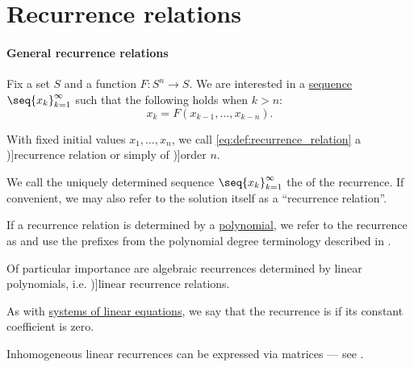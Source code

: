 \section{Recurrence relations}\label{sec:recurrence_relations}

\paragraph{General recurrence relations}

\begin{definition}\label{def:recurrence_relation}\mimprovised
  Fix a set \( S \) and a function \( F: S^n \to S \). We are interested in a \hyperref[def:sequence]{sequence} \( \seq{ x_k }_{k=1}^\infty \) such that the following holds when \( k > n \):
  \begin{equation}\label{eq:def:recurrence_relation}
    x_k = F(x_{k-1}, \ldots, x_{k-n}).
  \end{equation}

  With fixed initial values \( x_1, \ldots, x_n \), we call \eqref{eq:def:recurrence_relation} a \term[en=recurrence relation (\cite[def. 2.4.4]{Rosen2019DiscreteMathematics})]{recurrence relation} or simply  of \term[en=order (of linear recurring sequence) (\cite[395]{LidlNiederreiter1997FiniteFields})]{order} \( n \).

  \begin{thmenum}
     We call the uniquely determined sequence \( \seq{ x_k }_{k=1}^\infty \) the  of the recurrence. If convenient, we may also refer to the solution itself as a \enquote{recurrence relation}.

     If a recurrence relation is determined by a \hyperref[def:polynomial_algebra/polynomial]{polynomial}, we refer to the recurrence as  and use the prefixes from the polynomial degree terminology described in .

     Of particular importance are algebraic recurrences determined by linear polynomials, i.e. \term[en=linear recurring sequence (\cite[395]{LidlNiederreiter1997FiniteFields})]{linear recurrence relations}.

    As with \hyperref[rem:system_of_equations]{systems of linear equations}, we say that the recurrence is  if its constant coefficient is zero.

    Inhomogeneous linear recurrences can be expressed via matrices --- see .
  \end{thmenum}
\end{definition}
